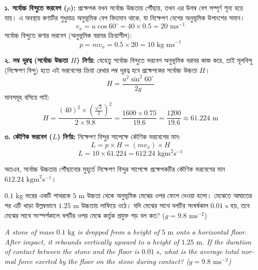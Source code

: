 \documentclass[12pt, a4paper]{article}
\begin{document}
{\begin{tcolorbox}[solutionbox={সমাধান (Solution)}]
\vspace{0.5em}
\textbf{১. সর্বোচ্চ বিন্দুতে ভরবেগ ($p$):}
প্রক্ষেপক যখন সর্বোচ্চ উচ্চতায় পৌঁছায়, তখন এর উলম্ব বেগ সম্পূর্ণ শূন্য হয়ে যায়। এ অবস্থায় কণাটির শুধুমাত্র অনুভূমিক বেগ বিদ্যমান থাকে, যা নিক্ষেপণ বেগের অনুভূমিক উপাংশের সমান।
$$v_x = u \cos 60^\circ = 40 \times 0.5 = 20\text{ ms}^{-1}$$
সর্বোচ্চ বিন্দুতে কণার ভরবেগ (অনুভূমিক বরাবর ক্রিয়াশীল):
$$p = m v_x = 0.5 \times 20 = 10\text{ kg ms}^{-1}$$

\vspace{0.5em}
\textbf{২. লম্ব দূরত্ব (সর্বোচ্চ উচ্চতা $H$) নির্ণয়:}
যেহেতু সর্বোচ্চ বিন্দুতে ভরবেগ অনুভূমিক বরাবর কাজ করে, তাই মূলবিন্দু (নিক্ষেপণ বিন্দু) হতে এই ভরবেগের ক্রিয়া রেখার লম্ব দূরত্ব হবে প্রক্ষেপকের সর্বোচ্চ উচ্চতা $H$।
$$H = \frac{u^2 \sin^2 60^\circ}{2g}$$
মানসমূহ বসিয়ে পাই:
$$H = \frac{(40)^2 \times \left(\frac{\sqrt{3}}{2}\right)^2}{2 \times 9.8} = \frac{1600 \times 0.75}{19.6} = \frac{1200}{19.6} \approx 61.224\text{ m}$$

\vspace{0.5em}
\textbf{৩. কৌণিক ভরবেগ ($L$) নির্ণয়:}
নিক্ষেপণ বিন্দুর সাপেক্ষে কৌণিক ভরবেগের মান:
$$L = p \times H = (m v_x) \times H$$
$$L = 10 \times 61.224 = 612.24\text{ kgm}^2\text{s}^{-1}$$

অতএব, সর্বোচ্চ উচ্চতায় পৌঁছানোর মুহূর্তে নিক্ষেপণ বিন্দুর সাপেক্ষে প্রক্ষেপকটির কৌণিক ভরবেগের মান $612.24\text{ kgm}^2\text{s}^{-1}$।
\end{tcolorbox}
\vspace{1em}

\begin{tcolorbox}[questionbox={প্রশ্ন (Question) 44}]
\noindent
$0.1\text{ kg}$ ভরের একটি পাথরকে $5\text{ m}$ উচ্চতা থেকে অনুভূমিক মেঝের ওপর ফেলে দেওয়া হলো। মেঝেতে আঘাতের পর এটি খাড়া উল্লম্বভাবে $1.25\text{ m}$ উচ্চতায় লাফিয়ে ওঠে। যদি মেঝের সাথে বলটির সংঘর্ষকাল $0.01\text{ s}$ হয়, তবে মেঝের সাথে সংস্পর্শকালে বলটির ওপর মেঝে কর্তৃক প্রযুক্ত গড় বল কত? ($g = 9.8\text{ ms}^{-2}$)

\vspace{0.8em}
\begin{english}
\noindent\textit{\color{darkgray}
A stone of mass $0.1\text{ kg}$ is dropped from a height of $5\text{ m}$ onto a horizontal floor. After impact, it rebounds vertically upward to a height of $1.25\text{ m}$. If the duration of contact between the stone and the floor is $0.01\text{ s}$, what is the average total normal force exerted by the floor on the stone during contact? ($g = 9.8\text{ ms}^{-2}$)
}
\end{english}
\end{tcolorbox}

}
\end{document}
